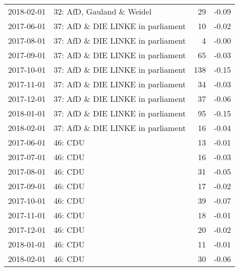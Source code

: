 \begin{adjustbox}{width=\textwidth}
\begin{tabular}{llrr}
  2018-02-01 & 32: AfD, Gauland \& Weidel &  29 & -0.09 \\ 
  2017-06-01 & 37: AfD \& DIE LINKE in parliament &  10 & -0.02 \\ 
  2017-08-01 & 37: AfD \& DIE LINKE in parliament &   4 & -0.00 \\ 
  2017-09-01 & 37: AfD \& DIE LINKE in parliament &  65 & -0.03 \\ 
  2017-10-01 & 37: AfD \& DIE LINKE in parliament & 138 & -0.15 \\ 
  2017-11-01 & 37: AfD \& DIE LINKE in parliament &  34 & -0.03 \\ 
  2017-12-01 & 37: AfD \& DIE LINKE in parliament &  37 & -0.06 \\ 
  2018-01-01 & 37: AfD \& DIE LINKE in parliament &  95 & -0.15 \\ 
  2018-02-01 & 37: AfD \& DIE LINKE in parliament &  16 & -0.04 \\ 
  2017-06-01 & 46: CDU &  13 & -0.01 \\ 
  2017-07-01 & 46: CDU &  16 & -0.03 \\ 
  2017-08-01 & 46: CDU &  31 & -0.05 \\ 
  2017-09-01 & 46: CDU &  17 & -0.02 \\ 
  2017-10-01 & 46: CDU &  39 & -0.07 \\ 
  2017-11-01 & 46: CDU &  18 & -0.01 \\ 
  2017-12-01 & 46: CDU &  20 & -0.02 \\ 
  2018-01-01 & 46: CDU &  11 & -0.01 \\ 
  2018-02-01 & 46: CDU &  30 & -0.06 \\ 
   \hline
\end{tabular}
\end{adjustbox}
